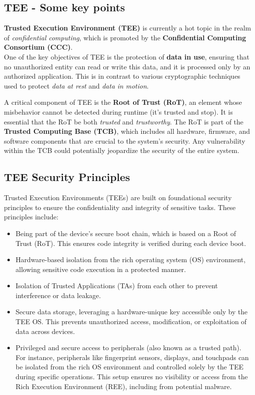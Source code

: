 \subsection{TEE - Some key points}
\textbf{Trusted Execution Environment (TEE)} is currently a hot topic in the realm of \textit{confidential computing}, which is promoted by the \textbf{Confidential Computing Consortium (CCC)}.\\ One of the key objectives of TEE is the protection of \textbf{data in use}, ensuring that no unauthorized entity can read or write this data, and it is processed only by an authorized application. This is in contrast to various cryptographic techniques used to protect \textit{data at rest} and \textit{data in motion}. \bigskip

A critical component of TEE is the \textbf{Root of Trust (RoT)}, an element whose misbehavior cannot be detected during runtime (it's trusted and stop). It is essential that the RoT be both \textit{trusted} and \textit{trustworthy}. The RoT is part of the \textbf{Trusted Computing Base (TCB)}, which includes all hardware, firmware, and software components that are crucial to the system's security. Any vulnerability within the TCB could potentially jeopardize the security of the entire system.

\subsection{TEE Security Principles}

Trusted Execution Environments (TEEs) are built on foundational security principles to ensure the confidentiality and integrity of sensitive tasks. These principles include:

\begin{itemize}
    \item Being part of the device's secure boot chain, which is based on a Root of Trust (RoT). This ensures code integrity is verified during each device boot.
    \item Hardware-based isolation from the rich operating system (OS) environment, allowing sensitive code execution in a protected manner.
    \item Isolation of Trusted Applications (TAs) from each other to prevent interference or data leakage.
    \item Secure data storage, leveraging a hardware-unique key accessible only by the TEE OS. This prevents unauthorized access, modification, or exploitation of data across devices.
    \item Privileged and secure access to peripherals (also known as a trusted path). For instance, peripherals like fingerprint sensors, displays, and touchpads can be isolated from the rich OS environment and controlled solely by the TEE during specific operations. This setup ensures no visibility or access from the Rich Execution Environment (REE), including from potential malware.
\end{itemize}


